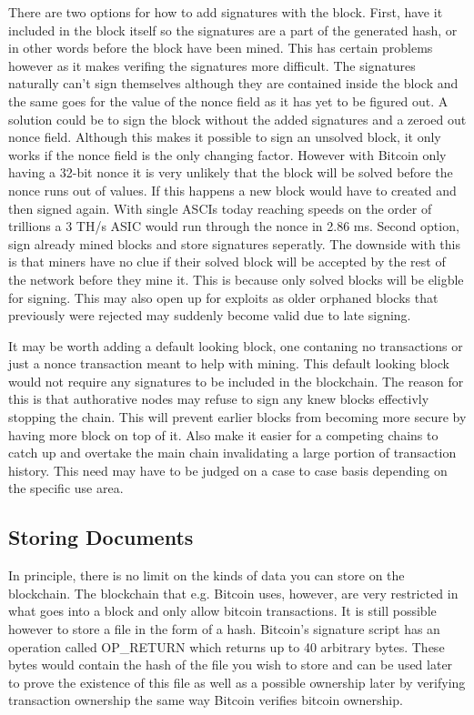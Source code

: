 \documentclass[12pt]{article}
\begin{document}
There are two options for how to add signatures with the block. First, have it included in the block itself so the signatures are a part of the generated hash, or in other words before the block have been mined. This has certain problems however as it makes verifing the signatures more difficult. The signatures naturally can't sign themselves although they are contained inside the block and the same goes for the value of the nonce field as it has yet to be figured out. A solution could be to sign the block without the added signatures and a zeroed out nonce field. Although this makes it possible to sign an unsolved block, it only works if the nonce field is the only changing factor. However with Bitcoin only having a 32-bit nonce it is very unlikely that the block will be solved before the nonce runs out of values. If this happens a new block would have to created and then signed again. With single ASCIs today reaching speeds on the order of trillions a 3 TH/s ASIC would run through the nonce in 2.86 ms. Second option, sign already mined blocks and store signatures seperatly. The downside with this is that miners have no clue if their solved block will be accepted by the rest of the network before they mine it. This is because only solved blocks will be eligble for signing. This may also open up for exploits as older orphaned blocks that previously were rejected may suddenly become valid due to late signing.

It may be worth adding a default looking block, one contaning no transactions or just a nonce transaction meant to help with mining. This default looking block would not require any signatures to be included in the blockchain. The reason for this is that authorative nodes may refuse to sign any knew blocks effectivly stopping the chain. This will prevent earlier blocks from becoming more secure by having more block on top of it. Also make it easier for a competing chains to catch up and overtake the main chain invalidating a large portion of transaction history. This need may have to be judged on a case to case basis depending on the specific use area.

\subsection{Storing Documents}

In principle, there is no limit on the kinds of data you can store on the blockchain. The blockchain that e.g. Bitcoin uses, however, are very restricted in what goes into a block and only allow bitcoin transactions. It is still possible however to store a file in the form of a hash. Bitcoin's signature script has an operation called OP\_RETURN which returns up to 40 arbitrary bytes. These bytes would contain the hash of the file you wish to store and can be used later to prove the existence of this file as well as a possible ownership later by verifying transaction ownership the same way Bitcoin verifies bitcoin ownership.
\end{document}
